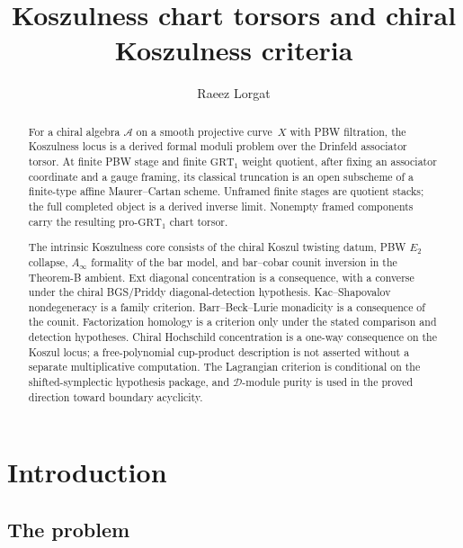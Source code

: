 \documentclass[11pt,reqno]{amsart}
\theoremstyle{definition}
\theoremstyle{remark}
\newcommand{\cA}{\mathcal{A}}
\newcommand{\cD}{\mathcal{D}}
\numberwithin{equation}{section}
\begin{document}
\title[Koszulness chart torsors]
{Koszulness chart torsors and chiral Koszulness criteria}

\author{Raeez Lorgat}
\address{Perimeter Institute for Theoretical Physics,
 Waterloo, ON N2L 2Y5, Canada}

\date{}

\begin{abstract}
For a chiral algebra $\cA$ on a smooth projective curve~$X$ with
PBW filtration, the Koszulness locus is a derived formal moduli
problem over the Drinfeld associator torsor. At finite PBW stage
and finite $\mathrm{GRT}_1$ weight quotient, after fixing an
associator coordinate and a gauge framing, its classical truncation
is an open subscheme of a finite-type affine Maurer--Cartan scheme.
Unframed finite stages are quotient stacks; the full completed
object is a derived inverse limit. Nonempty framed components carry
the resulting pro-$\mathrm{GRT}_1$ chart torsor.

The intrinsic Koszulness core consists of the chiral Koszul
twisting datum, PBW $E_2$ collapse, $A_\infty$ formality of the
bar model, and bar--cobar counit inversion in the Theorem-B
ambient. Ext diagonal concentration is a consequence, with a
converse under the chiral BGS/Priddy diagonal-detection
hypothesis. Kac--Shapovalov nondegeneracy is a family criterion.
Barr--Beck--Lurie monadicity is a consequence of the counit.
Factorization homology is a criterion only under the stated
comparison and detection hypotheses. Chiral Hochschild
concentration is a one-way consequence on the Koszul locus; a
free-polynomial cup-product description is not asserted without a
separate multiplicative computation.
The Lagrangian criterion is conditional on the shifted-symplectic
hypothesis package, and $\cD$-module purity is used in the proved
direction toward boundary acyclicity.
\end{abstract}

\maketitle

\section{Introduction}

\subsection{The problem}
\end{document}
